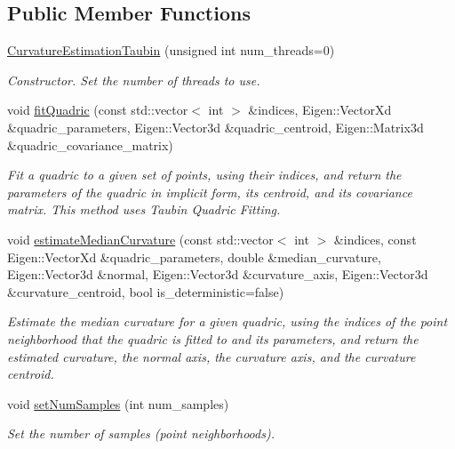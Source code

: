 \subsection*{\-Public \-Member \-Functions}
\begin{DoxyCompactItemize}
\item 
\hyperlink{classpcl_1_1_curvature_estimation_taubin_a2fb4286b0d2401e95494f85e012b11bc}{\-Curvature\-Estimation\-Taubin} (unsigned int num\-\_\-threads=0)
\begin{DoxyCompactList}\small\item\em \-Constructor. \-Set the number of threads to use. \end{DoxyCompactList}\item 
void \hyperlink{classpcl_1_1_curvature_estimation_taubin_a9f2acd4ca3dfc7977032e3930b5f33e8}{fit\-Quadric} (const std\-::vector$<$ int $>$ \&indices, \-Eigen\-::\-Vector\-Xd \&quadric\-\_\-parameters, \-Eigen\-::\-Vector3d \&quadric\-\_\-centroid, \-Eigen\-::\-Matrix3d \&quadric\-\_\-covariance\-\_\-matrix)
\begin{DoxyCompactList}\small\item\em \-Fit a quadric to a given set of points, using their indices, and return the parameters of the quadric in implicit form, its centroid, and its covariance matrix. \-This method uses \-Taubin \-Quadric \-Fitting. \end{DoxyCompactList}\item 
void \hyperlink{classpcl_1_1_curvature_estimation_taubin_ae3e284fecc00f9d7d87f23a0bdce848c}{estimate\-Median\-Curvature} (const std\-::vector$<$ int $>$ \&indices, const \-Eigen\-::\-Vector\-Xd \&quadric\-\_\-parameters, double \&median\-\_\-curvature, \-Eigen\-::\-Vector3d \&normal, \-Eigen\-::\-Vector3d \&curvature\-\_\-axis, \-Eigen\-::\-Vector3d \&curvature\-\_\-centroid, bool is\-\_\-deterministic=false)
\begin{DoxyCompactList}\small\item\em \-Estimate the median curvature for a given quadric, using the indices of the point neighborhood that the quadric is fitted to and its parameters, and return the estimated curvature, the normal axis, the curvature axis, and the curvature centroid. \end{DoxyCompactList}\item 
void \hyperlink{classpcl_1_1_curvature_estimation_taubin_a74a8347c5b02fd9f2eba38b5e16d7a30}{set\-Num\-Samples} (int num\-\_\-samples)
\begin{DoxyCompactList}\small\item\em \-Set the number of samples (point neighborhoods). \end{DoxyCompactList}\item 

\end{DoxyCompactItemize}
